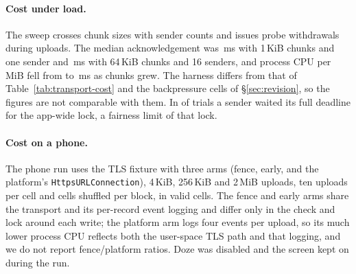 \paragraph{Cost under load.}\label{app:sweep} The sweep crosses chunk sizes with sender counts and issues probe
withdrawals during uploads. The median acknowledgement was \sweepAckSmallMs{}\,ms with 1\,KiB chunks and one sender and
\sweepAckLargeMs{}\,ms with 64\,KiB chunks and 16 senders, and process CPU per MiB fell from \sweepCpuSmall{} to
\sweepCpuLarge{}\,ms as chunks grew. The harness differs from that of Table~\ref{tab:transport-cost} and the backpressure
cells of \S\ref{sec:revision}, so the figures are not comparable with them. In \sweepLockStalls{} of \sweepLogged{} trials
a sender waited its full deadline for the app-wide lock, a fairness limit of that lock.



\paragraph{Cost on a phone.} The phone run uses the TLS fixture with three arms (fence, early, and the platform's
\texttt{HttpsURLConnection}), 4\,KiB, 256\,KiB and 2\,MiB uploads, ten uploads per cell and cells shuffled per block, in
\gdCells{} valid cells. The fence and early arms share the transport and its per-record event logging and differ only in
the check and lock around each write; the platform arm
logs four events per upload, so its much lower process CPU reflects both the user-space TLS path and that logging, and we
do not report fence/platform ratios. Doze was disabled and the screen kept on during the run.


